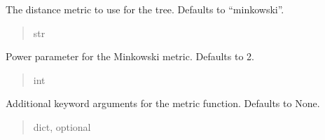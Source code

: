 \documentclass[letterpaper,10pt,english]{sphinxmanual}
\begin{document}
\begin{fulllineitems}
\begin{fulllineitems}
\begin{quote}
\begin{description}
\end{description}\end{quote}

\end{fulllineitems}


\begin{fulllineitems}
\label{\detokenize{application.algorithms.lof:application.algorithms.lof.LofConfiguration.LofConfiguration.metric}}
\pysigstartsignatures
{}
\pysigstopsignatures
\sphinxAtStartPar
The distance metric to use for the tree. Defaults to “minkowski”.
\begin{quote}\begin{description}
\sphinxAtStartPar
str

\end{description}\end{quote}

\end{fulllineitems}


\begin{fulllineitems}
\label{\detokenize{application.algorithms.lof:application.algorithms.lof.LofConfiguration.LofConfiguration.p}}
\pysigstartsignatures
{}
\pysigstopsignatures
\sphinxAtStartPar
Power parameter for the Minkowski metric. Defaults to 2.
\begin{quote}\begin{description}
\sphinxAtStartPar
int

\end{description}\end{quote}

\end{fulllineitems}


\begin{fulllineitems}
\label{\detokenize{application.algorithms.lof:application.algorithms.lof.LofConfiguration.LofConfiguration.metric_params}}
\pysigstartsignatures
{}
\pysigstopsignatures
\sphinxAtStartPar
Additional keyword arguments for the metric function. Defaults to None.
\begin{quote}\begin{description}
\sphinxAtStartPar
dict, optional


\end{description}
\end{quote}
\end{fulllineitems}
\end{fulllineitems}
\end{document}
